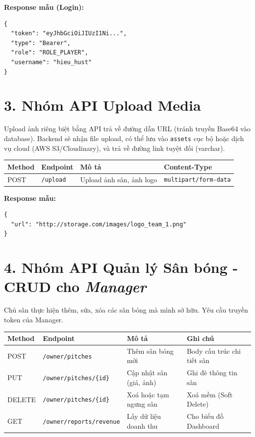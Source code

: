 \documentclass[12pt,a4paper]{article}
\begin{document}
\textbf{Response mẫu (Login):}
\begin{verbatim}
{
  "token": "eyJhbGciOiJIUzI1Ni...",
  "type": "Bearer",
  "role": "ROLE_PLAYER",
  "username": "hieu_hust"
}
\end{verbatim}

\section*{3. Nhóm API Upload Media}
Upload ảnh riêng biệt bằng API trả về đường dẫn URL (tránh truyền Base64 vào database). Backend sẽ nhận file upload, có thể lưu vào \texttt{assets} cục bộ hoặc dịch vụ cloud (AWS S3/Cloudinary), và trả về đường link tuyệt đối (varchar).

\vspace{0.3cm}
\noindent
\renewcommand{\arraystretch}{1.3}
\begin{tabular}{|p{1.5cm}|p{4cm}|p{4.5cm}|p{5cm}|}
    \hline
    \textbf{Method} & \textbf{Endpoint} & \textbf{Mô tả} & \textbf{Content-Type} \\
    \hline
    POST & \texttt{/upload} & Upload ảnh sân, ảnh logo & \texttt{multipart/form-data} \\
    \hline
\end{tabular}
\vspace{0.2cm}

\textbf{Response mẫu:} 
\begin{verbatim}
{
  "url": "http://storage.com/images/logo_team_1.png"
}
\end{verbatim}

\section*{4. Nhóm API Quản lý Sân bóng - CRUD cho \textit{Manager}}
Chủ sân thực hiện thêm, sửa, xóa các sân bóng mà mình sở hữu. Yêu cầu truyền token của Manager.

\vspace{0.3cm}
\noindent
\renewcommand{\arraystretch}{1.3}
\begin{tabular}{|p{1.5cm}|p{4.5cm}|p{5cm}|p{4cm}|}
    \hline
    \textbf{Method} & \textbf{Endpoint} & \textbf{Mô tả} & \textbf{Ghi chú} \\
    \hline
    POST & \texttt{/owner/pitches} & Thêm sân bóng mới & Body cấu trúc chi tiết sân \\
    \hline
    PUT & \texttt{/owner/pitches/\{id\}} & Cập nhật sân (giá, ảnh) & Ghi đè thông tin sân \\
    \hline
    DELETE & \texttt{/owner/pitches/\{id\}} & Xoá hoặc tạm ngưng sân & Xoá mềm (Soft Delete) \\
    \hline
    GET & \texttt{/owner/reports/revenue} & Lấy dữ liệu doanh thu & Cho biểu đồ Dashboard \\
    \hline
\end{tabular}
\end{document}
